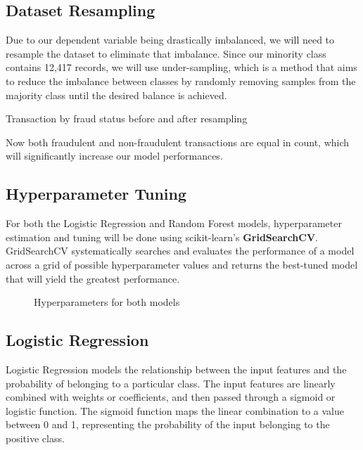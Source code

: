 \documentclass[12pt]{article}
\begin{document}
\subsection{Dataset Resampling}
Due to our dependent variable being drastically imbalanced, we will need to resample the dataset to eliminate that imbalance. Since our minority class contains 12,417 records, we will use under-sampling, which is a method that aims to reduce the imbalance between classes by randomly removing samples from the majority class until the desired balance is achieved.

\begin{table}[h]
    \centering
    
    \caption{Transaction by fraud status before and after resampling}
    \label{tab:my_label}
\end{table}
\newpage
Now both fraudulent and non-fraudulent transactions are equal in count, which will significantly increase our model performances.

\subsection{Hyperparameter Tuning}
For both the Logistic Regression and Random Forest models, hyperparameter estimation and tuning will be done using scikit-learn's \textbf{GridSearchCV}. GridSearchCV systematically searches and evaluates the performance of a model across a grid of possible hyperparameter values and returns the best-tuned model that will yield the greatest performance.


\begin{figure}[h]
    \centering
    \hfill
    \caption{Hyperparameters for both models}
    \label{fig:tables}
\end{figure}

\newpage
\subsection{Logistic Regression}
Logistic Regression models the relationship between the input features and the probability of belonging to a particular class.  The input features are linearly combined with weights or coefficients, and then passed through a sigmoid or logistic function. The sigmoid function maps the linear combination to a value between 0 and 1, representing the probability of the input belonging to the positive class. \\
\end{document}
